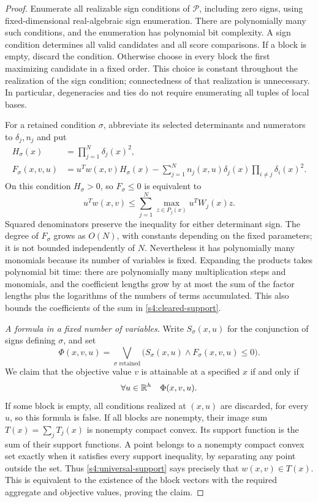 \begin{proof}
Enumerate all realizable sign conditions of $\mathcal P$, including
zero signs, using fixed-dimensional real-algebraic sign enumeration.
There are polynomially many such conditions, and the enumeration has
polynomial bit complexity. A sign condition determines all valid
candidates and all score comparisons. If a block is empty, discard
the condition. Otherwise choose in every block the first maximizing
candidate in a fixed order. This choice is constant throughout the
realization of the sign condition; connectedness of that realization
is unnecessary. In particular, degeneracies and ties do not require
enumerating all tuples of local bases.

For a retained condition $\sigma$, abbreviate its selected determinants
and numerators to $\delta_j,n_j$ and put
\begin{align}
 H_\sigma(x)&=\prod_{j=1}^N\delta_j(x)^2,\\
 F_\sigma(x,v,u)&=u^Tw(x,v)H_\sigma(x)
 -\sum_{j=1}^N n_j(x,u)\delta_j(x)
                         \prod_{i\ne j}\delta_i(x)^2.
 \label{s4:cleared-support}
\end{align}
On this condition $H_\sigma>0$, so $F_\sigma\le0$ is equivalent to
\begin{equation}
 u^Tw(x,v)\le\sum_{j=1}^N
                   \max_{z\in P_j(x)}u^TW_j(x)z.
 \label{s4:support-inequality}
\end{equation}
Squared denominators preserve the inequality for either determinant
sign. The degree of $F_\sigma$ grows as $O(N)$, with constants depending
on the fixed parameters; it is not bounded independently of $N$.
Nevertheless it has polynomially many monomials because its number of
variables is fixed. Expanding the products takes polynomial bit time:
there are polynomially many multiplication steps and monomials, and
the coefficient lengths grow by at most the sum of the factor lengths
plus the logarithms of the numbers of terms accumulated. This also
bounds the coefficients of the sum in \eqref{s4:cleared-support}.

\emph{A formula in a fixed number of variables.}
Write $S_\sigma(x,u)$ for the conjunction of signs defining $\sigma$,
and set
\[
 \Phi(x,v,u)=\bigvee_{\sigma\text{ retained}}
           \bigl(S_\sigma(x,u)\wedge F_\sigma(x,v,u)\le0\bigr).
\]
We claim that the objective value $v$ is attainable at a specified
$x$ if and only if
\begin{equation}
 \forall u\in\mathbb R^h\quad\Phi(x,v,u).
 \label{s4:universal-support}
\end{equation}
If some block is empty, all conditions realized at $(x,u)$ are
discarded, for every $u$, so this formula is false. If all blocks are
nonempty, their image sum $T(x)=\sum_jT_j(x)$ is nonempty compact
convex. Its support function is the sum of their support functions.
A point belongs to a nonempty compact convex set exactly when it
satisfies every support inequality, by separating any point outside
the set. Thus \eqref{s4:universal-support} says precisely that
$w(x,v)\in T(x)$. This is equivalent to the existence of the block
vectors with the required aggregate and objective values, proving
the claim.


\end{proof}

